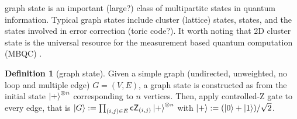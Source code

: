\documentclass[
aps,
pra,
floatfix,
]{revtex4-2}
\theoremstyle{plain}
\theoremstyle{definition}
\newtheorem{definition}{Definition}
\begin{document}
graph state is an important (large?) class of multipartite states in quantum information.
Typical graph states include cluster (lattice) states,  states, and the states involved in error correction (toric code?).
It worth noting that 2D cluster state is the universal resource for the measurement based quantum computation (MBQC) \cite{briegelMeasurementbasedQuantumComputation2009}.
\begin{definition}[graph state]\label{def:graph_state}
	Given a simple graph (undirected, unweighted, no loop and multiple edge) $G=(V,E)$, a graph state is constructed as 
	from the initial state $\ket{+}^{\otimes n}$ corresponding to $n$ vertices.
	Then, apply controlled-Z gate to every edge, that is 
	$\ket{G}:=\prod_{(i,j)\in E}\textsf{cZ}_{(i,j)} \ket{+}^{\otimes n}$
	with $\ket{+}: = (\ket{0}+\ket{1})/\sqrt{2}$.
\end{definition}
\end{document}

